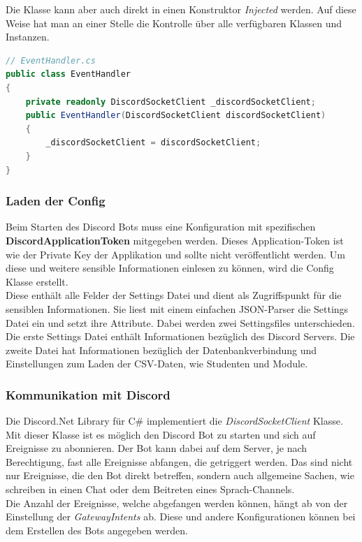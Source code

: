 \documentclass[a4paper, table]{article}
\begin{document}
Die Klasse kann aber auch direkt in einen Konstruktor \textit{Injected} werden.
Auf diese Weise hat man an einer Stelle die Kontrolle über alle verfügbaren Klassen und Instanzen.
\begin{lstlisting}[language=csharp]
// EventHandler.cs
public class EventHandler
{
    private readonly DiscordSocketClient _discordSocketClient;
    public EventHandler(DiscordSocketClient discordSocketClient)
    {
        _discordSocketClient = discordSocketClient;
    }
}
\end{lstlisting}

\subsubsection*{Laden der Config}
Beim Starten des Discord Bots muss eine Konfiguration mit spezifischen \textbf{DiscordApplicationToken} mitgegeben werden.
Dieses Application-Token ist wie der Private Key der Applikation und sollte nicht veröffentlicht werden.
Um diese und weitere sensible Informationen einlesen zu können, wird die Config Klasse erstellt.\\
Diese enthält alle Felder der Settings Datei und dient als Zugriffspunkt für die sensiblen Informationen.
Sie liest mit einem einfachen \gls{JSON}-Parser die Settings Datei ein und setzt ihre Attribute.
Dabei werden zwei Settingsfiles unterschieden.
Die erste Settings Datei enthält Informationen bezüglich des Discord Servers.
Die zweite Datei hat Informationen bezüglich der Datenbankverbindung und Einstellungen zum Laden der \gls{CSV}-Daten, wie Studenten und Module.

\subsubsection{Kommunikation mit Discord}
Die Discord.Net Library für C\# implementiert die \textit{DiscordSocketClient} Klasse.
Mit dieser Klasse ist es möglich den Discord Bot zu starten und sich auf Ereignisse zu abonnieren.
Der Bot kann dabei auf dem Server, je nach Berechtigung, fast alle Ereignisse abfangen, die getriggert werden.
Das sind nicht nur Ereignisse, die den Bot direkt betreffen, sondern auch allgemeine Sachen, 
wie schreiben in einen Chat oder dem Beitreten eines Sprach-Channels.\\
Die Anzahl der Ereignisse, welche abgefangen werden können, hängt ab von der Einstellung der \textit{GatewayIntents} ab.
Diese und andere Konfigurationen können bei dem Erstellen des Bots angegeben werden.
\end{document}
